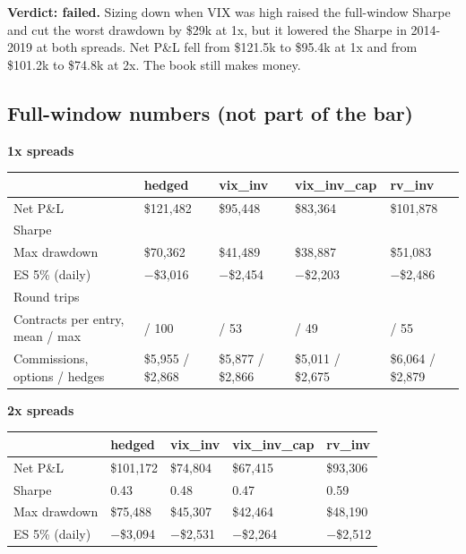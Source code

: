 \documentclass{article}
\begin{document}
\textbf{Verdict: failed.} Sizing down when VIX was high raised the full-window Sharpe and cut the worst drawdown by \$29k at 1x, but it lowered the Sharpe in 2014-2019 at both spreads. Net P\&L fell from \$121.5k to \$95.4k at 1x and from \$101.2k to \$74.8k at 2x. The book still makes money.

\subsection{Full-window numbers (not part of the bar)}

\textbf{1x spreads}

\begin{center}\small
\begin{tabularx}{\linewidth}{>{\raggedright\arraybackslash}X >{\raggedright\arraybackslash}X >{\raggedright\arraybackslash}X >{\raggedright\arraybackslash}X >{\raggedright\arraybackslash}X}
\toprule
\textbf{} & \textbf{hedged} & \textbf{vix\_inv} & \textbf{vix\_inv\_cap} & \textbf{rv\_inv} \\
\midrule
Net P\&L & \$121,482 & \$95,448 & \$83,364 & \$101,878 \\
Sharpe & 0.52 & 0.62 & 0.59 & 0.65 \\
Max drawdown & \$70,362 & \$41,489 & \$38,887 & \$51,083 \\
ES 5\% (daily) & \ensuremath{-}\$3,016 & \ensuremath{-}\$2,454 & \ensuremath{-}\$2,203 & \ensuremath{-}\$2,486 \\
Round trips & 182 & 183 & 183 & 187 \\
Contracts per entry, mean /\allowbreak{} max & 25.4 /\allowbreak{} 100 & 24.8 /\allowbreak{} 53 & 21.2 /\allowbreak{} 49 & 25.0 /\allowbreak{} 55 \\
Commissions, options /\allowbreak{} hedges & \$5,955 /\allowbreak{} \$2,868 & \$5,877 /\allowbreak{} \$2,866 & \$5,011 /\allowbreak{} \$2,675 & \$6,064 /\allowbreak{} \$2,879 \\
\bottomrule
\end{tabularx}
\end{center}

\textbf{2x spreads}

\begin{center}\small
\begin{tabularx}{\linewidth}{>{\raggedright\arraybackslash}X l l l l}
\toprule
\textbf{} & \textbf{hedged} & \textbf{vix\_inv} & \textbf{vix\_inv\_cap} & \textbf{rv\_inv} \\
\midrule
Net P\&L & \$101,172 & \$74,804 & \$67,415 & \$93,306 \\
Sharpe & 0.43 & 0.48 & 0.47 & 0.59 \\
Max drawdown & \$75,488 & \$45,307 & \$42,464 & \$48,190 \\
ES 5\% (daily) & \ensuremath{-}\$3,094 & \ensuremath{-}\$2,531 & \ensuremath{-}\$2,264 & \ensuremath{-}\$2,512 \\
\bottomrule
\end{tabularx}
\end{center}
\end{document}
